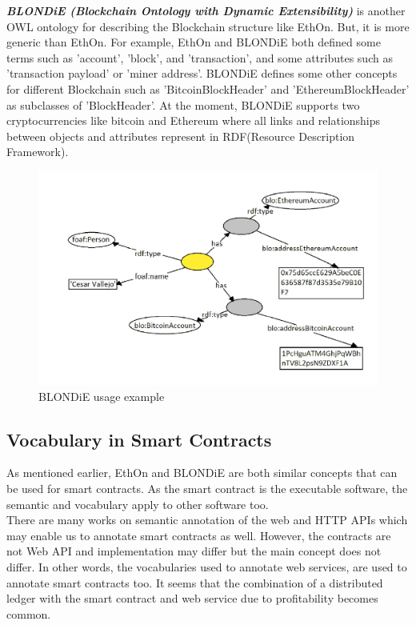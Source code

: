 \textbf{\textit{BLONDiE (Blockchain Ontology with Dynamic Extensibility)}} is another OWL ontology for describing the
Blockchain structure like EthOn. But, it is more generic than EthOn. For example, EthOn and BLONDiE both defined some terms such as 'account', 'block', and 'transaction', and some attributes such as 'transaction payload' or 'miner address'. BLONDiE defines some other concepts for different Blockchain such as 'BitcoinBlockHeader' and 'EthereumBlockHeader' as subclasses of 'BlockHeader'. At the moment, BLONDiE supports two cryptocurrencies like bitcoin and Ethereum where all links and relationships between objects and attributes represent in RDF(Resource Description Framework)\cite{Third}.
\begin{center}
	\begin{figure}[htb!]
		
		\begin{minipage}{0.55\linewidth}
			\centering
			\includegraphics[width=1.75\textwidth]{images/chap02_BLONDiE.png}
		\end{minipage}
		\caption[BLONDiE]{BLONDiE usage example\cite{Hector}}
		
		
	\end{figure}
	
\end{center}
\subsection{Vocabulary in Smart Contracts}
As mentioned earlier, EthOn and BLONDiE are both similar concepts that can be used for smart contracts. As the smart contract is the executable software, the semantic and vocabulary apply to other software too.\\
There are many works on semantic annotation of the web and HTTP APIs which may enable us to annotate smart contracts as well. However, the contracts are not Web API and implementation may differ but the main concept does not differ. In other words, the vocabularies used to annotate web services, are used to annotate smart contracts too. It seems that the combination of a distributed ledger with the smart contract and web service due to profitability becomes common\cite{Third}.


